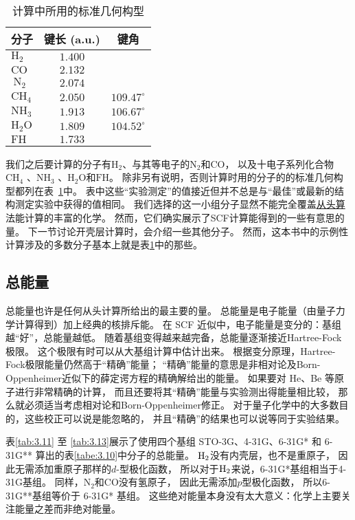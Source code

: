 \begin{table}\centering
	\caption{计算中所用的标准几何构型}
	\begin{tabular}{lcc}
		\hline 分子 & 键长 (a.u.) & 键角 \\
		\hline $\mathrm{H}_2$ & $1.400$ & \\
		$\mathrm{CO}$ & $2.132$ & \\
		$\mathrm{~N}_2$ & $2.074$ & \\
		$\mathrm{CH}_4$ & $2.050$ & $109.47^{\circ}$ \\
		$\mathrm{NH}_3$ & $1.913$ & $106.67^{\circ}$ \\
		$\mathrm{H}_2 \mathrm{O}$ & $1.809$ & $104.52^{\circ}$ \\
		$\mathrm{FH}$ & $1.733$ & \\
		\hline
	\end{tabular}
\label{tab:3.10}
\end{table}

我们之后要计算的分子有$\mathrm{H}_2$、与其等电子的$\mathrm{N}_2$和$\mathrm{CO}$，
以及十电子系列化合物$\mathrm{CH}_4$ 、$\mathrm{NH_3}$ 、$\mathrm{H_2O}$和$\mathrm{FH}$。 
除非另有说明，否则计算时用的分子的的标准几何构型都列在表~\ref{tab:3.10}中。 
表中这些“实验测定”的值接近但并不总是与“最佳”或最新的结构测定实验中获得的值相同。 
我们选择的这一小组分子显然不能完全覆盖\underline{从头算}法能计算的丰富的化学。 
然而，它们确实展示了SCF计算能得到的一些有意思的量。 
下一节讨论开壳层计算时，会介绍一些其他分子。
然而，这本书中的示例性计算涉及的多数分子基本上就是表\ref{tab:3.10}中的那些。

\subsection{总能量}
总能量也许是任何从头计算所给出的最主要的量。 
总能量是电子能量（由量子力学计算得到）加上经典的核排斥能。
在 SCF 近似中，电子能量是变分的：基组越“好”，总能量越低。
随着基组变得越来越完备，总能量逐渐接近Hartree-Fock 极限。 
这个极限有时可以从大基组计算中估计出来。
根据变分原理，Hartree-Fock极限能量仍然高于“精确”能量；
“精确”能量的意思是非相对论及Born-Oppenheimer近似下的薛定谔方程的精确解给出的能量。 
如果要对 He、Be 等原子进行非常精确的计算，
而且还要将其“精确”能量与实验测出得能量相比较，
那么就必须适当考虑相对论和Born-Oppenheimer修正。
对于量子化学中的大多数目的，这些校正可以说是能忽略的，
并且“精确”的结果也可以说等同于实验结果。

表\ref{tab:3.11} 至 \ref{tab:3.13}展示了使用四个基组 STO-3G、4-31G、6-31G* 和 6-31G** 算出的表\ref{tabe:3.10}中分子的总能量。
 $\mathrm{H}_2$没有内壳层，也不是重原子，
因此无需添加重原子那样的$d$-型极化函数，
所以对于$\mathrm{H}_2$来说，6-31G*基组相当于4-31G基组。
同样，$\mathrm{N_2}$和$\mathrm{CO}$没有氢原子，
因此无需添加$p$型极化函数，
所以6-31G**基组等价于 6-31G* 基组。
这些绝对能量本身没有太大意义：化学上主要关注能量之差而非绝对能量。

